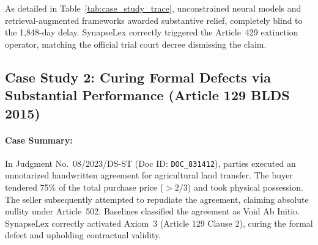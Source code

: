 \documentclass[11pt,a4paper]{article}
\begin{document}
\begin{table}[!ht]
\centering
\caption{Detailed Step-by-Step Comparative Adjudication Trace on Judgment No.~12/2024/DS-ST.}
\label{tab:case_study_trace}
\small
{}
\end{table}

As detailed in Table~\ref{tab:case_study_trace}, unconstrained neural models and retrieval-augmented frameworks awarded substantive relief, completely blind to the 1,848-day delay. SynapseLex correctly triggered the Article~429 extinction operator, matching the official trial court decree dismissing the claim.

\subsection{Case Study 2: Curing Formal Defects via Substantial Performance (Article 129 BLDS 2015)}
\paragraph{Case Summary:} In Judgment No.~08/2023/DS-ST (Doc ID: \texttt{DOC\_831412}), parties executed an unnotarized handwritten agreement for agricultural land transfer. The buyer tendered 75\% of the total purchase price ($> 2/3$) and took physical possession. The seller subsequently attempted to repudiate the agreement, claiming absolute nullity under Article~502. Baselines classified the agreement as Void Ab Initio. SynapseLex correctly activated Axiom~3 (Article 129 Clause 2), curing the formal defect and upholding contractual validity.
\end{document}
